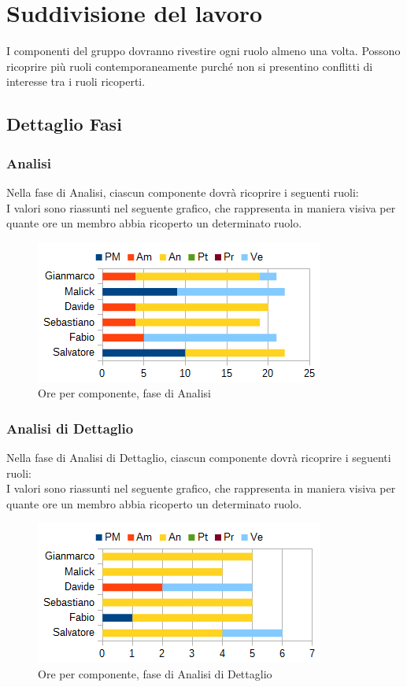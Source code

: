 \section{Suddivisione del lavoro}
I componenti del gruppo dovranno rivestire ogni ruolo almeno una volta. Possono ricoprire più ruoli contemporaneamente purché non si presentino conflitti di interesse tra i ruoli ricoperti.
	\subsection{Dettaglio Fasi}
		\subsubsection{Analisi}
		Nella fase di Analisi, ciascun componente dovrà ricoprire i seguenti ruoli: \\
		I valori sono riassunti nel seguente grafico, che rappresenta in maniera visiva per quante ore un membro abbia ricoperto un determinato ruolo.
		\begin{figure}[htbp]
			\centering
			\includegraphics[scale=1]{immagini/grafici/analisi-barra.png}
			\caption{Ore per componente, fase di Analisi}
		\end{figure}
		\subsubsection{Analisi di Dettaglio}
		Nella fase di Analisi di Dettaglio, ciascun componente dovrà ricoprire i seguenti ruoli: \\
		I valori sono riassunti nel seguente grafico, che rappresenta in maniera visiva per quante ore un membro abbia ricoperto un determinato ruolo.
		\begin{figure}[htbp]
			\centering
			\includegraphics[scale=1]{immagini/grafici/analisi_dettaglio-barra.png}
			\caption{Ore per componente, fase di Analisi di Dettaglio}
		\end{figure}
